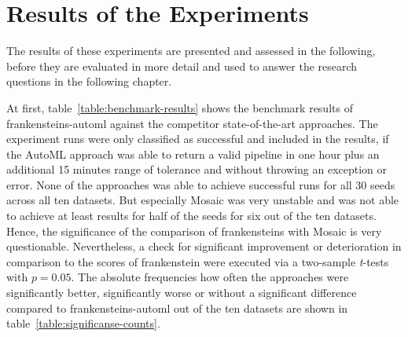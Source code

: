 \section{Results of the Experiments}
\label{sec:evaluation:results}
 The results of these experiments are presented and assessed in the following, before they are evaluated in more detail and used to answer the research questions in the following chapter.

 At first, table~\ref{table:benchmark-results} shows the benchmark results of frankensteins-automl against the competitor state-of-the-art approaches.
 The experiment runs were only classified as successful and included in the results, if the AutoML approach was able to return a valid pipeline in one hour plus an additional 15 minutes range of tolerance and without throwing an exception or error.\newline
 None of the approaches was able to achieve successful runs for all 30 seeds across all ten datasets.
 But especially Mosaic was very unstable and was not able to achieve at least results for half of the seeds for six out of the ten datasets.
 Hence, the significance of the comparison of frankensteins with Mosaic is very questionable.\newline
 Nevertheless, a check for significant improvement or deterioration in comparison to the scores of frankenstein were executed via a two-sample \textit{t}-tests with $p = 0.05$.
 The absolute frequencies how often the approaches were significantly better, significantly worse or without a significant difference compared to frankensteins-automl out of the ten datasets are shown in table~\ref{table:significanse-counts}.

